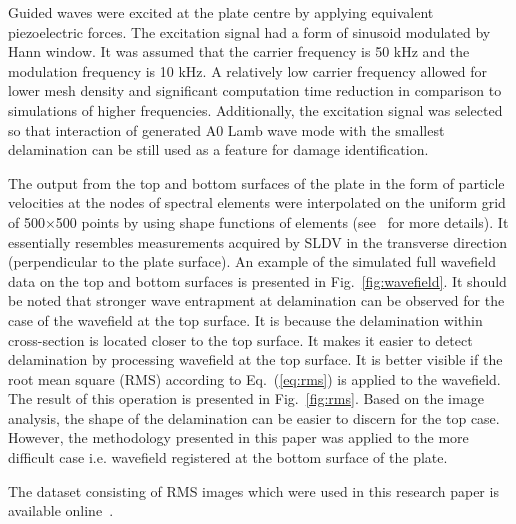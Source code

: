 Guided waves were excited at the plate centre by applying equivalent piezoelectric forces.
The excitation signal had a form of sinusoid modulated by Hann window. 
It was assumed that the carrier frequency is 50 kHz and the modulation frequency is 10 kHz.
A relatively low carrier frequency allowed for lower mesh density and significant computation time reduction in comparison to simulations of higher frequencies.
Additionally, the excitation signal was selected so that interaction of generated A0 Lamb wave mode with the smallest delamination can be still used as a feature for damage identification.

The output from the top and bottom surfaces of the plate in the form of particle velocities at the nodes of spectral elements were interpolated on the uniform grid of 500\(\times\)500 points by using shape functions of elements (see~\cite{Kudela2020} for more details).
It essentially resembles measurements acquired by SLDV in the transverse direction (perpendicular to the plate surface).
An example of the simulated full wavefield data on the top and bottom surfaces is presented in Fig.~\ref{fig:wavefield}.
It should be noted that stronger wave entrapment at delamination can be observed for the case of the wavefield at the top surface.
It is because the delamination within cross-section is located closer to the top surface.
It makes it easier to detect delamination by processing wavefield at the top surface.
It is better visible if the root mean square (RMS) according to Eq.~(\ref{eq:rms}) is applied to the wavefield.
The result of this operation is presented in Fig.~\ref{fig:rms}.
Based on the image analysis, the shape of the delamination can be easier to discern for the top case.
However, the methodology presented in this paper was applied to the more difficult case i.e. wavefield registered at the bottom surface of the plate.

The dataset consisting of RMS images which were used in this research paper is available online~\cite{Kudela2020d}.

